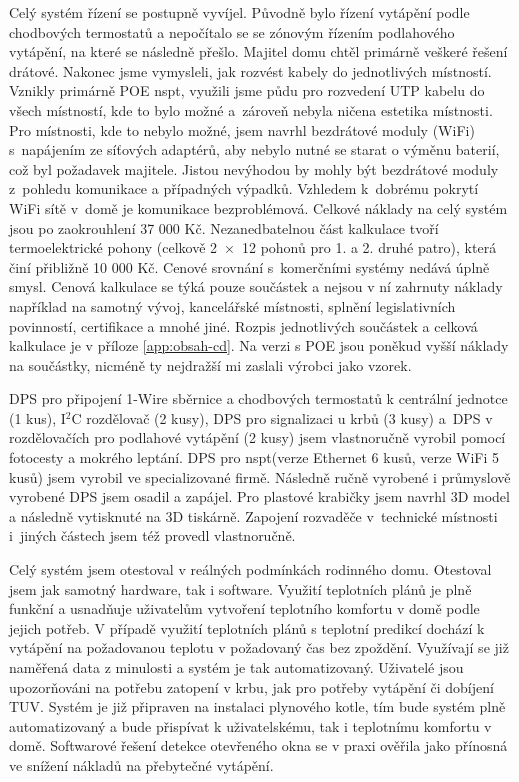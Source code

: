 Celý systém řízení se postupně vyvíjel. Původně bylo řízení vytápění podle chodbových termostatů a nepočítalo se se zónovým řízením podlahového vytápění, na které se následně přešlo. Majitel domu chtěl primárně veškeré řešení drátové. Nakonec jsme vymysleli, jak rozvést kabely do jednotlivých místností. Vznikly primárně POE \acrshort{nspt}, využili jsme půdu pro rozvedení UTP kabelu do všech místností, kde to bylo možné a~zároveň nebyla ničena estetika místnosti. Pro místnosti, kde to nebylo možné, jsem navrhl bezdrátové moduly (WiFi) s~napájením ze síťových adaptérů, aby nebylo nutné se starat o výměnu baterií, což byl požadavek majitele. Jistou nevýhodou by mohly být bezdrátové moduly z~pohledu komunikace a případných výpadků. Vzhledem k~dobrému pokrytí WiFi sítě v~domě je komunikace bezproblémová. Celkové náklady na celý systém jsou po zaokrouhlení 37 000 Kč. Nezanedbatelnou část kalkulace tvoří termoelektrické pohony (celkově 2~×~12 pohonů pro 1. a 2. druhé patro), která činí přibližně 10 000 Kč. Cenové srovnání s~komerčními systémy nedává úplně smysl. Cenová kalkulace se týká pouze součástek a nejsou v ní zahrnuty náklady například na samotný vývoj, kancelářské místnosti, splnění legislativních povinností, certifikace a mnohé jiné. Rozpis jednotlivých součástek a celková kalkulace je v příloze \ref{app:obsah-cd}.  Na verzi s POE jsou poněkud vyšší náklady na součástky, nicméně ty nejdražší mi zaslali výrobci jako vzorek.

DPS pro připojení 1-Wire sběrnice a chodbových termostatů k centrální jednotce (1 kus), I$^{2}$C rozdělovač (2 kusy), DPS pro signalizaci u krbů (3 kusy) a~DPS v rozdělovačích pro podlahové vytápění (2 kusy) jsem vlastnoručně vyrobil pomocí fotocesty a mokrého leptání. DPS pro \acrshort{nspt}(verze Ethernet 6 kusů, verze WiFi 5 kusů) jsem vyrobil ve specializované firmě. Následně ručně vyrobené i průmyslově vyrobené DPS jsem osadil a zapájel. Pro plastové krabičky jsem navrhl 3D model a následně vytisknuté na 3D tiskárně. Zapojení rozvaděče v~technické místnosti i~jiných částech jsem též provedl vlastnoručně.

Celý systém jsem otestoval v reálných podmínkách rodinného domu. Otestoval jsem jak samotný hardware, tak i software. Využití teplotních plánů je plně funkční a usnadňuje uživatelům vytvoření teplotního komfortu v domě podle jejich potřeb. V případě využití teplotních plánů s teplotní predikcí dochází k vytápění na požadovanou teplotu v požadovaný čas bez zpoždění. Využívají se již naměřená data z minulosti a systém je tak automatizovaný. Uživatelé jsou upozorňováni na potřebu zatopení v krbu, jak pro potřeby vytápění či dobíjení TUV. Systém je již připraven na instalaci plynového kotle, tím bude systém plně automatizovaný a bude přispívat k uživatelskému, tak i teplotnímu komfortu v domě. Softwarové řešení detekce otevřeného okna se v praxi ověřila jako přínosná ve snížení nákladů na přebytečné vytápění.

